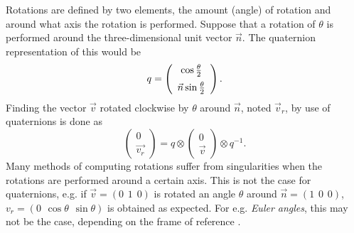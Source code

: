 \documentclass{LTHthesis}
\begin{document}
Rotations are defined by two elements, the amount (angle) of rotation and around what axis the rotation is performed. Suppose that a rotation of $\theta$ is performed around the three-dimensional unit vector $\vec n$. The quaternion representation of this would be
\begin{equation}
q = \left(\begin{array}{c}\cos{\frac{\theta}{2}}\vspace{5pt}\\ \vec{n}\sin{\frac{\theta}{2}}\end{array}\right).
\end{equation}  
%
Finding the vector $\vec v$ rotated clockwise by $\theta$ around $\vec n$, noted $\vec v_r$, by use of quaternions is done as
%
\begin{equation}
\left(\begin{array}{c}0\\ \vec{v_r}\end{array}\right) = q\otimes \left(\begin{array}{c}0\\ \vec{v}\end{array}\right) \otimes q^{-1}.
\end{equation}
%
Many methods of computing rotations suffer from singularities when the rotations are performed around a certain axis. This is not the case for quaternions, e.g. if $\vec{v} = (0 \hspace{5pt}1 \hspace{5pt} 0)$ is rotated an angle $\theta$ around $\vec{n} = (1 \hspace{5pt} 0 \hspace{5pt} 0)$, $v_r = (0 \hspace{5pt} \cos{\theta} \hspace{5pt} \sin{\theta})$ is obtained as expected. For e.g. \emph{Euler angles}, this may not be the case, depending on the frame of reference \cite{euler}. 
\end{document}

